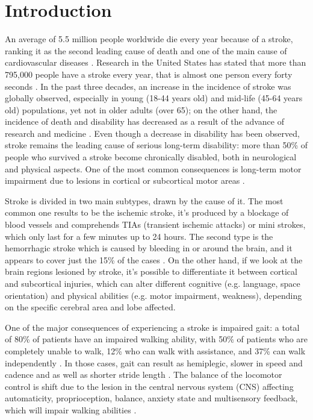 \chapter{Introduction}
An average of 5.5 million people worldwide die every year because of a stroke, ranking it as the second leading cause of death and one of the main cause of cardiovascular diseases \parencite{Donkor_2018}. Research in the United States has stated that more than 795,000 people have a stroke every year, that is almost one person every forty seconds \parencite{Tsao_2023}. In the past three decades, an increase in the incidence of stroke was globally observed, especially in young (18-44 years old) and mid-life (45-64 years old) populations, yet not in older adults (over 65); on the other hand, the incidence of death and disability has decreased as a result of the advance of research and medicine \parencite{Yahya_2020}. 
Even though a decrease in disability has been observed, stroke remains the leading cause of serious long-term disability: more than 50\% of people who survived a stroke become chronically disabled, both in neurological and physical aspects. One of the most common consequences is long-term motor impairment due to lesions in cortical or subcortical motor areas \parencite{Karthikeyan_2019}. 

Stroke is divided in two main subtypes, drawn by the cause of it. The most common one results to be the ischemic stroke, it's produced by a blockage of blood vessels and comprehends TIAs (transient ischemic attacks) or mini strokes, which only last for a few minutes up to 24 hours. The second type is the hemorrhagic stroke which is caused by bleeding in or around the brain, and it appears to cover just the 15\% of the cases \parencite{Abdu_2021}. 
On the other hand, if we look at the brain regions lesioned by stroke, it's possible to differentiate it between cortical and subcortical injuries, which can alter different cognitive (e.g. language, space orientation) and physical abilities (e.g. motor impairment, weakness), depending on the specific cerebral area and lobe affected. 

One of the major consequences of experiencing a stroke is impaired gait: a total of 80\% of patients have an impaired walking ability, with 50\% of patients who are completely unable to walk, 12\% who can walk with assistance, and 37\% can walk independently \parencite{Balaban_2014}. In those cases, gait can result as hemiplegic, slower in speed and cadence and as well as shorter stride length \parencite{Gomez_2020}. The balance of the locomotor control is shift due to the lesion in the central nervous system (CNS) affecting automaticity, proprioception, balance, anxiety state and multisensory feedback, which will impair walking abilities \parencite{Clark_2015}. 

